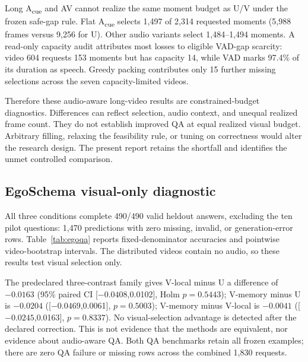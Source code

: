 \documentclass[10pt,twocolumn]{article}
\newcommand{\Acue}{A\textsubscript{cue}}
\begin{document}
Long \Acue{} and AV cannot realize the same moment budget as U/V under the frozen safe-gap rule. Flat \Acue{} selects 1,497 of 2,314 requested moments (5,988 frames versus 9,256 for U). Other audio variants select 1,484--1,494 moments. A read-only capacity audit attributes most losses to eligible VAD-gap scarcity: video 604 requests 153 moments but has capacity 14, while VAD marks 97.4\% of its duration as speech. Greedy packing contributes only 15 further missing selections across the seven capacity-limited videos.

Therefore these audio-aware long-video results are constrained-budget diagnostics. Differences can reflect selection, audio context, and unequal realized frame count. They do not establish improved QA at equal realized visual budget. Arbitrary filling, relaxing the feasibility rule, or tuning on correctness would alter the research design. The present report retains the shortfall and identifies the unmet controlled comparison.

\subsection{EgoSchema visual-only diagnostic}
All three conditions complete 490/490 valid heldout answers, excluding the ten pilot questions: 1,470 predictions with zero missing, invalid, or generation-error rows. Table~\ref{tab:egoqa} reports fixed-denominator accuracies and pointwise video-bootstrap intervals. The distributed videos contain no audio, so these results test visual selection only.

\begin{table}[h]
\centering\scriptsize

\caption{EgoSchema: the same 490 heldout questions per condition, all answered validly. Intervals are pointwise 95\% video-bootstrap intervals; missing/error rows would remain incorrect in the denominator.}\label{tab:egoqa}
\end{table}

The predeclared three-contrast family gives V-local minus U a difference of $-0.0163$ (95\% paired CI [$-0.0408$,0.0102], Holm $p=0.5443$); V-memory minus U is $-0.0204$ ([$-0.0469$,0.0061], $p=0.5003$); V-memory minus V-local is $-0.0041$ ([$-0.0245$,0.0163], $p=0.8337$). No visual-selection advantage is detected after the declared correction. This is not evidence that the methods are equivalent, nor evidence about audio-aware QA. Both QA benchmarks retain all frozen examples; there are zero QA failure or missing rows across the combined 1,830 requests.
\end{document}
